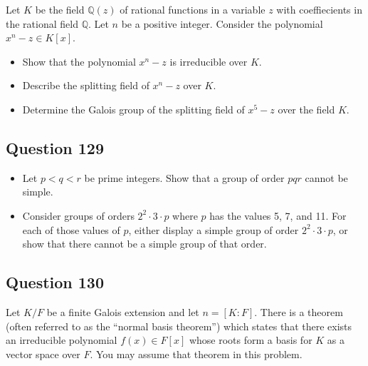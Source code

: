 \documentclass[12pt]{article}
\begin{document}
Let \(K\) be the field \(\mathbb Q(z)\) of rational functions in a
variable \(z\) with coeffiecients in the rational field \(\mathbb Q\).
Let \(n\) be a positive integer. Consider the polynomial
\(x^n-z\in K[x]\).

\begin{itemize}
\item
  Show that the polynomial \(x^n-z\) is irreducible over \(K\).
\item
  Describe the splitting field of \(x^n-z\) over \(K\).
\item
  Determine the Galois group of the splitting field of \(x^5-z\) over
  the field \(K\).
\end{itemize}

\hypertarget{question-129}{%
\subsection{Question 129}\label{question-129}}

\begin{itemize}
\item
  Let \(p<q<r\) be prime integers. Show that a group of order \(pqr\)
  cannot be simple.
\item
  Consider groups of orders \(2^2\cdot 3\cdot p\) where \(p\) has the
  values 5, 7, and 11. For each of those values of \(p\), either display
  a simple group of order \(2^2\cdot 3\cdot p\), or show that there
  cannot be a simple group of that order.
\end{itemize}

\hypertarget{question-130}{%
\subsection{Question 130}\label{question-130}}

Let \(K/F\) be a finite Galois extension and let \(n=[K:F]\). There is a
theorem (often referred to as the ``normal basis theorem'') which states
that there exists an irreducible polynomial \(f(x)\in F[x]\) whose roots
form a basis for \(K\) as a vector space over \(F\). You may assume that
theorem in this problem.
\end{document}
